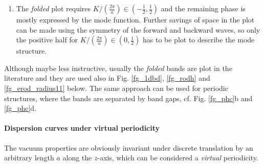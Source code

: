 {\begin{enumerate}
{In vacuum, the mode function takes the simplest form, being constant $\mathbf{u(\mathbf{r})} = 1$ at all frequencies. The dispersion relation of vacuum forms a direct line as plot in Fig. \ref{fg_phc}a.} 
 \item{The \textit{folded} plot requires $K/\left(\frac{2\pi}{a}\right) \in (-\frac{1}{2}, \frac{1}{2})$ and the remaining phase is mostly expressed by the mode function. 
Further savings of space in the plot can be made using the symmetry of the forward and backward waves, so only the positive half for $K/\left(\frac{2\pi}{a}\right) \in (0, \frac{1}{2})$ has to be plot to describe the mode structure.} 
 \end{enumerate}
Although maybe less instructive, usually the \textit{folded} bands are plot in the literature and they are used also in Fig. \ref{fg_1dbd}, \ref{fg_rodh} and \ref{fg_erod_radius11} below. The same approach can be used for periodic structures, where the bands are separated by band gaps, cf. Fig. \ref{fg_phc}b and \ref{fg_phc}d.
}
\paragraph{Dispersion curves under virtual periodicity} \label{par_disp_curv_per}%
The vacuum properties are obviously invariant under discrete translation by an arbitrary length $a$ along the $z$-axis, which can be considered a \textit{virtual} periodicity. 

